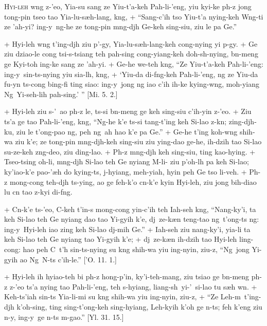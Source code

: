 \header
\lettrine{H}{yi-leh} w\oo ng z-'eo, Yia-su sang ze Yiu-t'a-keh Pah-li-'eng, yiu kyi-ke p\oo h-z jong tong-pin tseo tao Yia-lu-s\ae h-lang, k\oo ng,
+	``Sang-c'ih tso Yiu-t'a nying-keh W\oo ng-ti ze 'ah-yi? ing-y\y\ ng\oo-he ze tong-pin m\oo ng-dj\oo h Ge-keh sing-siu, ziu le pa Ge.''
\par
+	Hyi-leh w\oo ng t'ing-dj\oo h ziu p'\oo-gy\y, Yia-lu-s\ae h-lang-keh cong-nying yi p\oo-gy\y.
+	Ge ziu dziao-le cong tsi-s-tsiang teh pah-sing cong-yiang-keh doh-sh\y-nying, b\e n-meng ge Kyi-toh ing-ke sang ze 'ah-yi.
+	Ge-he we-teh k\oo ng, ``Ze Yiu-t'a-keh Pah-li-'eng: ing-y\y\ sin-ts-nying yiu sia-l\oo h, k\oo ng,
+	`Yiu-da di-f\oo ng-keh Pah-li-'eng, ng ze Yiu-da fu-y\y n ts-cong bing-fi ting siao: ing-y\y\ jong ng iao c'ih ih-ke ky\y ing-w\oo ng, moh-yiang Ng\oo\ Yi-seh-lih pah-sing.' '' [Mi. 5. 2.]
\par
+	Hyi-leh ziu s-'\oo\ ao p\oo h-z le, ts-si b\e n-meng ge keh sing-siu c'ih-yin z-'eo.
+	Ziu ts'a ge tao Pah-li-'eng, k\oo ng, ``Ng-he k'e ts-si tang-t'ing keh Si-lao z-k\e n; zing-dj\oo h-ku, ziu le t'ong-pao ng\oo, peh ng\oo\ ah hao k'e pa Ge.''
+	Ge-he t'ing koh-w\oo ng shih-wa ziu k'e; ze tong-pin m\oo ng-dj\oo h-keh sing-siu ziu ying-dao ge-he, ih-dzih tao Si-lao su-ze-keh z\oo ng-deo, ziu ding-lao.
+	P\oo h-z m\oo ng-dj\oo h keh sing-siu, ting kao-hying.
+	Tseo-tsing oh-li, m\oo ng-dj\oo h Si-lao teh Ge nyiang M\oo-li-\oo\; ziu p'oh-l\oo h pa keh Si-lao; ky'iao-k'e pao-'\ae h do kying-ts, j\y-hyiang, meh-yiah, hyin peh Ge tso li-veh.
+	P\oo h-z mong-cong teh-dj\oo h ts-ying, ao ge feh-k'o c\y n-k'e kyin Hyi-leh, ziu jong bih-diao lu c\y n tao z-kyi di-f\oo ng.
\par
+	C\y n-k'e ts-'eo, C\y-keh t'in-s mong-cong yin-c'ih teh Iah-seh k\oo ng, ``Nang-ky'i, ta keh Si-lao teh Ge nyiang dao tao Yi-gyih k'e, dj\y\ ze-k\ae n teng-tao ng\oo\ t'ong-ts ng: ing-y\y\ Hyi-leh iao zing keh Si-lao dj\y-mih Ge.''
+	Iah-seh ziu nang-ky'i, yia-li ta keh Si-lao teh Ge nyiang tao Yi-gyih k'e;
+	dj\y\ ze-k\ae n ih-dzih tao Hyi-leh ling-cong: hao peh C\y\ t'\oo h sin-ts-nying su k\oo ng shih-wa yiu ing-nyin, ziu-z, ``Ng\oo\ jong Yi-gyih ao Ng\oo\ N-ts c'ih-le.'' ['O. 11. 1.]
\par
+	Hyi-leh ih hyiao-teh bi p\oo h-z hong-p'in, ky'i-teh-mang, ziu tsiao ge b\e n-meng p\oo h-z z-'eo ts'a nying tao Pah-li-'eng, teh s-hyiang, liang-sh\y{}i-'\oo\ si-lao tu s\ae h w\e n.
+	Keh-ts'iah sin-ts Yia-li-mi su k\oo ng shih-wa yiu ing-nyin, ziu-z,
+	``Ze Leh-m\oo\ t'ing-dj\oo h k'oh-sing, ting sing-t'ong-keh sing-hyiang, Leh-kyih k'oh ge n-ts; feh k'eng ziu \e n-y\y, ing-y\y\ ge n-ts m-gao.'' [Yl. 31. 15.]
